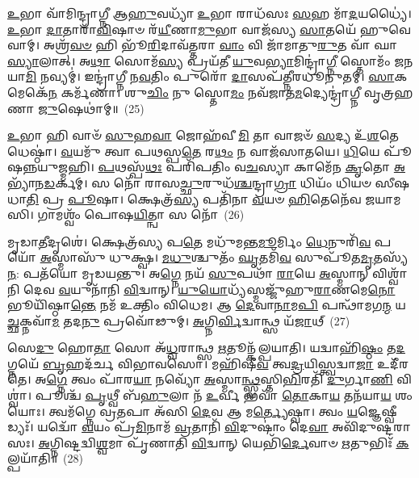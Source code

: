 {\anuvakamend[{𑌦𑌿𑌵᳴𑌞𑍍𑌚 \ul{𑌵𑌿}\-𑌤𑍍𑌵𑌾 \ul{𑌗𑌾}\-𑌤𑍁𑌨𑍍𑌤𑍍𑌰𑌯𑍋᳴𑌦𑌶 𑌚}]}

\-\ul{𑌉}\-𑌭𑌾 𑌵𑌾᳴𑌮𑌿𑌨𑍍𑌦𑍍𑌰𑌾𑌗𑍍𑌨𑍀 𑌆\-\ul{𑌹𑍁}\-𑌵𑌧𑍍𑌯𑌾᳴ \ul{𑌉}\-𑌭𑌾 𑌰𑌾𑌧᳴𑌸𑌃 \ul{𑌸}\-𑌹 𑌮𑌾᳴\-\ul{𑌦}\-𑌯𑌧𑍍𑌯𑍈॑। \ul{𑌉}\-𑌭𑌾 \ul{𑌦𑌾}\-𑌤𑌾𑌰𑌾᳴\-\ul{𑌵𑌿}\-𑌷𑌾𑍞 𑌰᳴\-\ul{𑌯𑍀}\-𑌣𑌾\-\ul{𑌮𑍁}\-𑌭𑌾 𑌵𑌾𑌜᳴𑌸𑍍𑌯 \ul{𑌸𑌾}\-𑌤𑌯𑍇᳴ 𑌹𑍁𑌵𑍇 𑌵𑌾𑌮𑍍। 𑌅𑌶𑍍𑌰᳴\-\ul{𑌵}\-\-\ul{𑍞} 𑌹𑌿 𑌭𑍂᳴\-\ul{𑌰𑌿}\-𑌦𑌾𑌵᳴𑌤𑍍𑌤𑌰𑌾 \ul{𑌵𑌾𑌂} 𑌵𑌿 𑌜𑌾᳴𑌮𑌾𑌤𑍁\-\ul{𑌰𑍁}\-𑌤 𑌵𑌾᳴ 𑌘𑌾 \ul{𑌸𑍍𑌯𑌾}\-𑌲𑌾𑌤𑍍। 𑌅\-\ul{𑌥𑌾} 𑌸𑍋𑌮᳴\-\ul{𑌸𑍍𑌯} 𑌪𑍍𑌰𑌯᳴𑌤𑍀 \ul{𑌯𑍁}\-𑌵\-\ul{𑌭𑍍𑌯𑌾}\-𑌮𑌿𑌨𑍍𑌦𑍍𑌰𑌾॑\-\ul{𑌗𑍍𑌨𑍀} 𑌸𑍍𑌤𑍋𑌮𑌂᳴ 𑌜𑌨𑌯𑌾\-\ul{𑌮𑌿} 𑌨𑌵𑍍𑌯𑌮𑍍॑। 𑌇𑌨𑍍𑌦𑍍𑌰𑌾॑𑌗𑍍𑌨𑍀 𑌨\-\ul{𑌵}\-𑌤𑌿𑌂 𑌪𑍁𑌰𑍋᳴ \ul{𑌦𑌾}\-𑌸𑌪᳴𑌤𑍍𑌨𑍀𑌰𑌧𑍂𑌨𑍁𑌤𑌮𑍍। \ul{𑌸𑌾}\-𑌕𑌮𑍇𑌕𑍇᳴\-\ul{𑌨} 𑌕𑌰𑍍𑌮᳴𑌣𑌾। 𑌶𑍁\-\ul{𑌚𑌿𑌂} 𑌨𑍁 𑌸𑍍𑌤𑍋\-\ul{𑌮𑌂} 𑌨𑌵᳴𑌜𑌾𑌤\-\ul{𑌮}\-𑌦𑍍𑌯𑍇𑌨𑍍𑌦𑍍𑌰𑌾॑𑌗𑍍𑌨𑍀 𑌵𑍃𑌤𑍍𑌰𑌹𑌣𑌾 \ul{𑌜𑍁}\-𑌷𑍇𑌥𑌾॑𑌮𑍍॥~(25)

\-\ul{𑌉}\-𑌭𑌾 𑌹𑌿 𑌵𑌾𑍞᳴ \ul{𑌸𑍁}\-𑌹\-\ul{𑌵𑌾} 𑌜𑍋𑌹᳴𑌵𑍀\-\ul{𑌮𑌿} 𑌤𑌾 𑌵𑌾𑌜𑍞᳴ \ul{𑌸}\-𑌦𑍍𑌯 𑌉᳴\-\ul{𑌶}\-𑌤𑍇 𑌧𑍇𑌷𑍍𑌠𑌾॑। \ul{𑌵}\-𑌯𑌮𑍁᳴ 𑌤𑍍𑌵𑌾 𑌪𑌥𑌸𑍍𑌪\-\ul{𑌤𑍇} 𑌰\-\ul{𑌥𑌂} 𑌨 𑌵𑌾𑌜᳴𑌸𑌾𑌤𑌯𑍇। \ul{𑌧𑌿}\-𑌯𑍇 𑌪𑍂᳴𑌷𑌨𑍍𑌨𑌯𑍁𑌜𑍍𑌮𑌹𑌿। \ul{𑌪}\-𑌥𑌸𑍍𑌪᳴\-\ul{𑌥𑌃} 𑌪𑌰𑌿᳴𑌪𑌤𑌿𑌂 𑌵\-\ul{𑌚}\-𑌸𑍍𑌯𑌾 𑌕𑌾𑌮𑍇᳴𑌨 \ul{𑌕𑍃}\-𑌤𑍋 \ul{𑌅}\-𑌭𑍍𑌯𑌾᳴𑌨\-\ul{𑌡}\-𑌰𑍍𑌕𑌮𑍍। 𑌸 𑌨𑍋᳴ 𑌰𑌾𑌸\-\ul{𑌚𑍍𑌛𑍁}\-𑌰𑍁𑌧᳴\-\ul{𑌶𑍍𑌚}\-𑌨𑍍𑌦𑍍𑌰𑌾\-\ul{𑌗𑍍𑌰𑌾} 𑌧𑌿𑌯𑌂᳴ 𑌧𑌿𑌯𑍞 𑌸𑍀𑌷𑌧𑌾\-\ul{𑌤𑌿} 𑌪𑍍𑌰 \ul{𑌪𑍂}\-𑌷𑌾। 𑌕𑍍𑌷𑍇𑌤𑍍𑌰᳴\-\ul{𑌸𑍍𑌯} 𑌪𑌤𑌿᳴𑌨𑌾 \ul{𑌵}\-𑌯𑍞 \ul{𑌹𑌿}\-𑌤𑍇𑌨𑍇᳴𑌵 𑌜𑌯𑌾𑌮𑌸𑌿। 𑌗𑌾𑌮𑌶𑍍𑌵𑌂᳴ 𑌪𑍋𑌷\-\ul{𑌯𑌿}\-𑌤𑍍𑌨𑍍𑌵𑌾 𑌸 𑌨𑍋᳴~(26)

𑌮𑍃𑌡𑌾\-\ul{𑌤𑍀}\-𑌦𑍃𑌶𑍇॑। 𑌕𑍍𑌷𑍇𑌤𑍍𑌰᳴𑌸𑍍𑌯 𑌪\-\ul{𑌤𑍇} 𑌮𑌧𑍁᳴𑌮𑌨𑍍𑌤\-\ul{𑌮𑍂}\-𑌰𑍍𑌮𑌿𑌂 \ul{𑌧𑍇}\-𑌨𑍁𑌰𑌿᳴\-\ul{𑌵} 𑌪𑌯𑍋᳴ \ul{𑌅}\-𑌸𑍍𑌮𑌾𑌸𑍁᳴ 𑌧𑍁𑌕𑍍𑌷𑍍𑌵। \ul{𑌮}\-\-\ul{𑌧𑍁}\-𑌶𑍍𑌚𑍁𑌤𑌂᳴ \ul{𑌘𑍃}\-𑌤𑌮𑌿᳴\-\ul{𑌵} 𑌸𑍁𑌪𑍂᳴𑌤\-\ul{𑌮𑍃}\-𑌤𑌸𑍍𑌯᳴ \ul{𑌨}\-: 𑌪𑌤᳴𑌯𑍋 𑌮𑍃𑌡𑌯𑌨𑍍𑌤𑍁। 𑌅\-\ul{𑌗𑍍𑌨𑍇} 𑌨𑌯᳴ \ul{𑌸𑍁}\-𑌪𑌥𑌾᳴ \ul{𑌰𑌾}\-𑌯𑍇 \ul{𑌅}\-𑌸𑍍𑌮𑌾𑌨𑍍 𑌵𑌿𑌶𑍍𑌵𑌾᳴𑌨𑌿 𑌦𑍇𑌵 \ul{𑌵}\-𑌯𑍁𑌨𑌾᳴𑌨𑌿 \ul{𑌵𑌿}\-𑌦𑍍𑌵𑌾𑌨𑍍। \ul{𑌯𑍁}\-\-\ul{𑌯𑍋}\-𑌧𑍍𑌯᳴𑌸𑍍𑌮𑌜𑍍𑌜𑍁᳴𑌹𑍁\-\ul{𑌰𑌾}\-𑌣𑌮𑍇\-\ul{𑌨𑍋} 𑌭𑍂𑌯𑌿᳴𑌷𑍍𑌠𑌾\-\ul{𑌨𑍍𑌤𑍇} 𑌨𑌮᳴ 𑌉𑌕𑍍𑌤𑌿𑌂 𑌵𑌿𑌧𑍇𑌮। 𑌆 \ul{𑌦𑍇}\-𑌵𑌾\-\ul{𑌨𑌾}\-𑌮\-\ul{𑌪𑌿} 𑌪𑌨𑍍𑌥𑌾᳴𑌮𑌗\-\ul{𑌨𑍍𑌮} 𑌯\-\ul{𑌚𑍍𑌛}\-𑌕𑍍𑌨𑌵𑌾᳴\-\ul{𑌮} 𑌤𑌦\-\ul{𑌨𑍁} 𑌪𑍍𑌰𑌵𑍋᳴𑌢𑍁𑌮𑍍। \ul{𑌅}\-𑌗𑍍𑌨𑌿\-\ul{𑌰𑍍𑌵𑌿}\-𑌦𑍍𑌵𑌾𑌨𑍍𑌥𑍍𑌸 𑌯᳴\-\ul{𑌜𑌾}\-𑌥𑍍~(27)

𑌸𑍇\-\ul{𑌦𑍁} 𑌹𑍋\-\ul{𑌤𑌾} 𑌸𑍋 𑌅᳴\-\ul{𑌧𑍍𑌵}\-𑌰𑌾𑌨𑍍𑌥𑍍𑌸 \ul{𑌋}\-𑌤𑍂𑌨𑍍𑌕᳴𑌲𑍍𑌪𑌯𑌾𑌤𑌿। 𑌯𑌦𑍍𑌵𑌾\-𑌹𑌿᳴\-\ul{𑌷𑍍𑌠𑌂} 𑌤\-\ul{𑌦}\-𑌗𑍍𑌨𑌯𑍇᳴ \ul{𑌬𑍃}\-𑌹𑌦᳴𑌰𑍍𑌚 𑌵𑌿𑌭𑌾𑌵𑌸𑍋। 𑌮𑌹𑌿᳴𑌷𑍀\-\ul{𑌵} 𑌤𑍍𑌵\-\ul{𑌦𑍍𑌰}\-𑌯𑌿𑌸𑍍𑌤𑍍𑌵𑌦𑍍𑌵𑌾\-\ul{𑌜𑌾} 𑌉𑌦𑍀᳴𑌰𑌤𑍇। 𑌅\-\ul{𑌗𑍍𑌨𑍇} 𑌤𑍍𑌵𑌂 𑌪𑌾᳴𑌰\-\ul{𑌯𑌾} 𑌨𑌵𑍍𑌯𑍋᳴ \ul{𑌅}\-𑌸𑍍𑌮𑌾\-\ul{𑌨𑍍𑌥𑍍𑌸𑍍𑌵}\-𑌸𑍍𑌤𑌿\-\ul{𑌭𑌿}\-𑌰𑌤𑌿᳴ \ul{𑌦𑍁}\-𑌰𑍍𑌗𑌾\-\ul{𑌣𑌿} 𑌵𑌿𑌶𑍍𑌵𑌾॑। 𑌪𑍂𑌶𑍍𑌚᳴ \ul{𑌪𑍃}\-𑌥𑍍𑌵𑍀 𑌬᳴\-\ul{𑌹𑍁}\-𑌲𑌾 𑌨᳴ \ul{𑌉}\-𑌰𑍍𑌵𑍀 𑌭𑌵𑌾᳴ \ul{𑌤𑍋}\-𑌕𑌾\-\ul{𑌯} 𑌤𑌨᳴𑌯𑌾\-\ul{𑌯} 𑌶𑌂 𑌯𑍋𑌃। 𑌤𑍍𑌵𑌮᳴𑌗𑍍𑌨𑍇 𑌵𑍍𑌰\-\ul{𑌤}\-𑌪𑌾 𑌅᳴𑌸𑌿 \ul{𑌦𑍇}\-𑌵 𑌆 𑌮\-\ul{𑌰𑍍𑌤𑍍𑌯𑍇}\-𑌷𑍍𑌵𑌾। 𑌤𑍍𑌵𑌂 \ul{𑌯}\-𑌜𑍍𑌞𑍇𑌷𑍍𑌵𑍀𑌡𑍍𑌯𑌃᳴। 𑌯𑌦𑍍𑌵𑍋᳴ \ul{𑌵}\-𑌯𑌂 𑌪𑍍𑌰᳴\-\ul{𑌮𑌿}\-𑌨𑌾𑌮᳴ \ul{𑌵𑍍𑌰}\-𑌤𑌾𑌨𑌿᳴ \ul{𑌵𑌿}\-𑌦𑍁𑌷𑌾𑌂॑ 𑌦𑍇\-\ul{𑌵𑌾} 𑌅𑌵𑌿᳴𑌦𑍁𑌷𑍍𑌟𑌰𑌾𑌸𑌃। \ul{𑌅}\-𑌗𑍍𑌨𑌿𑌷𑍍𑌟𑌦𑍍𑌵𑌿\-\ul{𑌶𑍍𑌵}\-𑌮𑌾 𑌪𑍃᳴𑌣𑌾𑌤𑌿 \ul{𑌵𑌿}\-𑌦𑍍𑌵𑌾𑌨𑍍 𑌯𑍇𑌭𑌿᳴\-\ul{𑌰𑍍𑌦𑍇}\-𑌵𑌾𑍞 \ul{𑌋}\-𑌤𑍁𑌭𑌿𑌃᳴ \ul{𑌕}\-𑌲𑍍𑌪𑌯𑌾᳴𑌤𑌿॥~(28)

